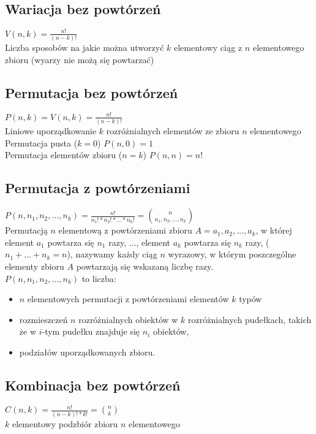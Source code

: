 \documentclass[a4paper,12pt]{article}
\begin{document}
\subsection{Wariacja bez powtórzeń} $V(n,k)=\frac{n!}{(n-k)!}$ \\
Liczba sposobów na jakie można utworzyć $k$ elementowy ciąg z $n$ elementowego zbioru (wyarzy nie możą się powtarzać)
\subsection{Permutacja bez powtórzeń} $P(n,k)=V(n,k)=\frac{n!}{(n-k)!}$\\
Liniowe uporządkowanie $k$ rozróżnialnych elementów ze zbioru $n$ elementowego \\
Permutacja pusta ($k=0$) $P(n,0)=1$ \\
Permutacja elementów zbioru ($n=k$) $P(n, n)=n!$
\subsection{Permutacja z powtórzeniami} $P(n,n_1,n_2,\dots ,n_k)=\frac{n!}{n_1!*n_2!*\dots *n_k!}= {{n}\choose{n_1,n_2,\dots, n_k}}$ \\
Permutacją $n$ elementową z powtórzeniami zbioru  $A=a_1,a_2,\dots,a_k$, w której element $a_1$ powtarza się $n_1$ razy, $\dots$, element $a_k$ powtarza się $n_k$ razy, ($n_1+ \dots + n_k= n$), nazywamy każdy ciąg $n$ wyrazowy, w którym poszczególne elementy zbioru $A$ powtarzają się wskazaną liczbę razy.\\

$P(n,n_1,n_2,\dots ,n_k)$ to liczba: 
\begin{itemize} \itemsep1pt \parskip0pt 
 \item $n$ elementowych permutacji z powtórzeniami elementów $k$ typów
 \item rozmieszczeń $n$ rozróżnialnych obiektów w $k$ rozróżnialnych pudełkach, takich że w $i$-tym pudełku znajduje się $n_i$ obiektów,
 \item podziałów uporządkowanych zbioru.
\end{itemize}
\subsection{Kombinacja bez powtórzeń} $C(n,k)=\frac{n!}{(n-k)!*k!}={{n}\choose{k}}$ \\
$k$ elementowy podzbiór zbioru $n$ elementowego 
\end{document}

